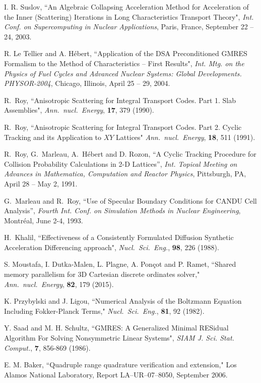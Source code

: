 \begin{thebibliography}{99}
I. R. Suslov, ``An Algebraic Collapsing Acceleration Method for Acceleration of the Inner (Scattering) Iterations in Long Characteristics Transport Theory",
{\sl Int. Conf. on Supercomputing in Nuclear Applications}, Paris, France, September 22 -- 24, 2003.

R. Le Tellier and A. H\'ebert, ``Application of the DSA Preconditioned GMRES Formalism to the Method of Characteristics -- First Results",
{\sl Int. Mtg. on the Physics of Fuel Cycles and Advanced Nuclear Systems:
Global Developments. PHYSOR-2004}, Chicago, Illinois, April 25 -- 29, 2004.

R.~Roy, ``Anisotropic Scattering for Integral Transport Codes. Part 1. Slab
Assemblies", {\sl Ann.~nucl.~Energy}, {\bf 17}, 379 (1990).

R.~Roy, ``Anisotropic Scattering for Integral Transport Codes. Part 2. Cyclic
Tracking and its Application to $XY$ Lattices" {\sl Ann.~nucl.~Energy}, {\bf
18}, 511 (1991).

R.~Roy, G.~Marleau, A.~H\'ebert and D. Rozon, ``A Cyclic Tracking Procedure for Collision
Probability Calculations in 2-D Lattices'', {\sl Int. Topical Meeting on
Advances in Mathematica, Computation and Reactor Physics}, Pittsburgh, PA, April
28 -- May 2, 1991. 

G.~Marleau and R.~Roy, ``Use of Specular Boundary Conditions for CANDU Cell
Analysis'',  {\sl Fourth Int. Conf. on Simulation Methods in Nuclear
Engineering}, Montr\'eal, June 2-4, 1993.

H.~Khalil, ``Effectiveness of a Consistently Formulated Diffusion Synthetic
Acceleration Differencing approach", {\sl Nucl.~Sci.~Eng.}, {\bf 98}, 226 (1988).

S. Moustafa, I. Dutka-Malen, L. Plagne, A. Pon\c cot and P. Ramet, ``Shared memory parallelism for 3D Cartesian discrete ordinates solver," {\sl Ann.~nucl.~Energy}, {\bf 82}, 179 (2015).

K. Przybylski and J. Ligou, ``Numerical Analysis of the Boltzmann Equation Including Fokker-Planck Terms," {\sl Nucl.~Sci.~Eng.}, {\bf 81}, 92 (1982).

Y. Saad and M. H. Schultz, ``GMRES: A Generalized Minimal RESidual Algorithm For Solving Nonsymmetric Linear Systems", {\sl SIAM J. Sci. Stat. Comput.}, {\bf 7}, 856-869 (1986).

E. M. Baker, ``Quadruple range quadrature verification and extension," Los Alamos National Laboratory,
Report LA--UR--07--8050, September 2006.


\end{thebibliography}
